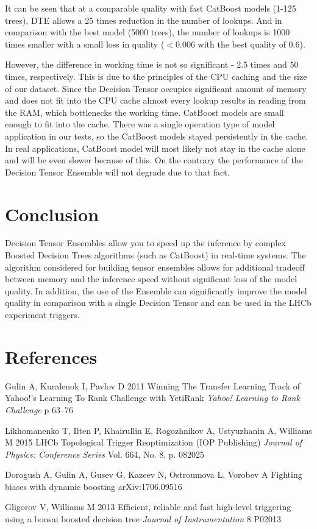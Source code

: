 \documentclass[a4paper]{jpconf}
\begin{document}
It can be seen that at a comparable quality with fast CatBoost models (1-125 trees), DTE allows a 25 times reduction in the number of lookups. And in comparison with the best model (5000 trees), the number of lookups is 1000 times smaller with a small loss in quality ($ <0.006 $ with the best quality of 0.6).

However, the difference in working time is not so significant - 2.5 times and 50 times, respectively. This is due to the principles of the CPU caching and the size of our dataset. Since the Decision Tensor occupies significant amount of memory and does not fit into the CPU cache almost every lookup results in reading from the RAM, which bottlenecks the working time. CatBoost models are small enough to fit into the cache. There was a single operation type of model application in our tests, so the CatBoost models stayed persistently in the cache. In real applications, CatBoost model will most likely not stay in the cache alone and will be even slower because of this. On the contrary the performance of the Decision Tensor Ensemble will not degrade due to that fact.

\section{Conclusion}

Decision Tensor Ensembles allow you to speed up the inference by complex Boosted Decision Trees algorithms (such as CatBoost) in real-time systems. The algorithm considered for building tensor ensembles allows for additional tradeoff between memory and the inference speed without significant loss of the model quality.
In addition, the use of the Ensemble can significantly improve the model quality in comparison with a single Decision Tensor and can be used in the LHCb experiment triggers.


\section*{References}
\item Gulin A, Kuralenok I, Pavlov D 2011 Winning The Transfer Learning Track of Yahoo!'s Learning To Rank Challenge with YetiRank {\it Yahoo! Learning to Rank Challenge} p 63--76
\item Likhomanenko T, Ilten P, Khairullin E, Rogozhnikov A, Ustyuzhanin A, Williams M 2015 LHCb Topological Trigger Reoptimization (IOP Publishing) {\it Journal of Physics: Conference Series} Vol. 664, No. 8, p. 082025
\item Dorogush A, Gulin A, Gusev G, Kazeev N, Ostroumova L, Vorobev A Fighting biases with dynamic boosting arXiv:1706.09516
\item Gligorov V, Williams M 2013 Efficient, reliable and fast high-level triggering using a bonsai boosted decision tree {\it Journal of Instrumentation} 8 P02013
\endnumrefs
\end{document}

